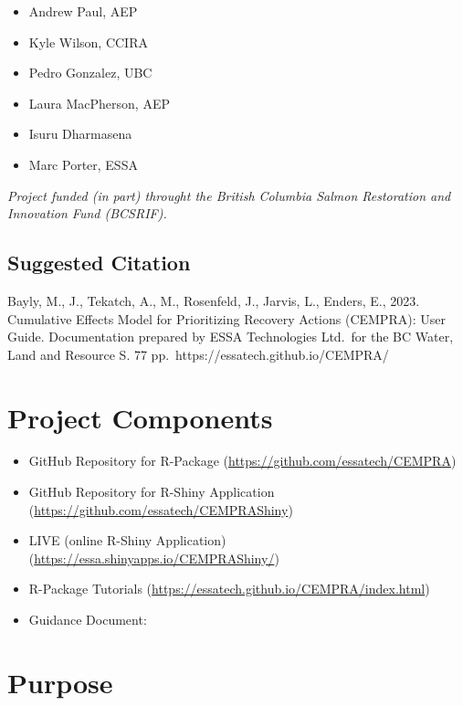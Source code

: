 \documentclass[
  letterpaper,
  DIV=11,
  numbers=noendperiod]{scrreprt}
\providecommand{\tightlist}{%
  \setlength{\itemsep}{0pt}\setlength{\parskip}{0pt}}\usepackage{longtable,booktabs,array}
\begin{document}
\begin{itemize}
\tightlist
\item
  Andrew Paul, AEP
\item
  Kyle Wilson, CCIRA
\item
  Pedro Gonzalez, UBC
\item
  Laura MacPherson, AEP
\item
  Isuru Dharmasena
\item
  Marc Porter, ESSA
\end{itemize}

\emph{{Project funded (in part) throught the British Columbia Salmon
Restoration and Innovation Fund (BCSRIF).}}

\hypertarget{suggested-citation}{%
\subsection*{Suggested Citation}\label{suggested-citation}}

Bayly, M., J., Tekatch, A., M., Rosenfeld, J., Jarvis, L., Enders, E.,
2023. Cumulative Effects Model for Prioritizing Recovery Actions
(CEMPRA): User Guide. Documentation prepared by ESSA Technologies
Ltd.~for the BC Water, Land and Resource S. 77
pp.~https://essatech.github.io/CEMPRA/

\hypertarget{project-components}{%
\section*{Project Components}\label{project-components}}


\begin{itemize}
\tightlist
\item
  GitHub Repository for R-Package
  (\url{https://github.com/essatech/CEMPRA})
\item
  GitHub Repository for R-Shiny Application
  (\url{https://github.com/essatech/CEMPRAShiny})
\item
  LIVE (online R-Shiny Application)
  (\url{https://essa.shinyapps.io/CEMPRAShiny/})
\item
  R-Package Tutorials
  (\url{https://essatech.github.io/CEMPRA/index.html})
\item
  Guidance Document:
\end{itemize}

\hypertarget{purpose}{%
\section*{Purpose}\label{purpose}}
\end{document}

